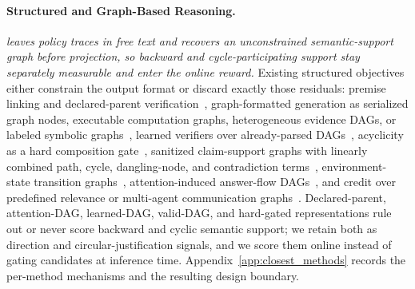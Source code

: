 \paragraph{Structured and Graph-Based Reasoning.}
\textit{\method leaves policy traces in free text and recovers an unconstrained semantic-support graph before projection, so backward and cycle-participating support stay separately measurable and enter the online reward.} Existing structured objectives either constrain the output format or discard exactly those residuals: premise linking and declared-parent verification~\citep{mukherjee2025parc,wen2025grid,fang2026gov}, graph-formatted generation as serialized graph nodes, executable computation graphs, heterogeneous evidence DAGs, or labeled symbolic graphs~\citep{zhang2026dagmath,dong2026structured,anonymous2026structuralcot,jin2026verigraph,liu2026graph,li2026gotr1}, learned verifiers over already-parsed DAGs~\citep{karmore2026atomgraph}, acyclicity as a hard composition gate~\citep{li2026contract}, sanitized claim-support graphs with linearly combined path, cycle, dangling-node, and contradiction terms~\citep{abdullah2026turdpo}, environment-state transition graphs~\citep{feng2026rewardflow}, attention-induced answer-flow DAGs~\citep{dong2026flowtracer}, and credit over predefined relevance or multi-agent communication graphs~\citep{che2026graphgrpo,cang2026graphgrpo}. Declared-parent, attention-DAG, learned-DAG, valid-DAG, and hard-gated representations rule out or never score backward and cyclic semantic support; we retain both as direction and circular-justification signals, and we score them online instead of gating candidates at inference time. Appendix~\ref{app:closest_methods} records the per-method mechanisms and the resulting design boundary.

